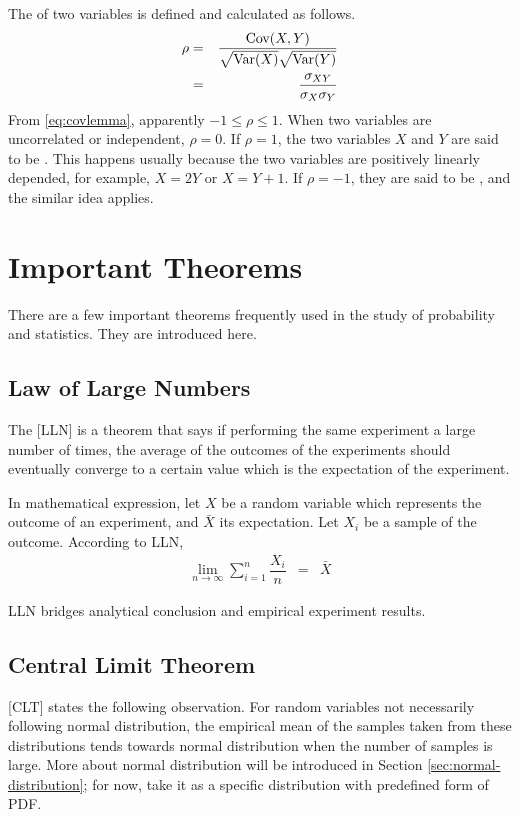 The  of two variables is defined and calculated as follows.
\begin{eqnarray}
	\rho &=& \dfrac{\textup{Cov}(X, Y)}{\sqrt{\textup{Var}(X)}\sqrt{\textup{Var}(Y)}} \nonumber \\
	&=& \dfrac{\sigma_{XY}}{\sigma_X\sigma_Y} \nonumber
\end{eqnarray}
From \eqref{eq:covlemma}, apparently $-1\leq \rho \leq 1$. When two variables are uncorrelated or independent, $\rho=0$. If $\rho=1$, the two variables $X$ and $Y$ are said to be . This happens usually because the two variables are positively linearly depended, for example, $X=2Y$ or $X=Y+1$. If $\rho=-1$, they are said to be , and the similar idea applies.

\section{Important Theorems}

There are a few important theorems frequently used in the study of probability and statistics. They are introduced here.

\subsection{Law of Large Numbers} \label{subsec:largenumbers}

The [LLN] is a theorem that says if performing the same experiment a large number of times, the average of the outcomes of the experiments should eventually converge to a certain value which is the expectation of the experiment.

In mathematical expression, let $X$ be a random variable which represents the outcome of an experiment, and $\bar{X}$ its expectation. Let $X_i$ be a sample of the outcome. According to LLN,
\begin{eqnarray}
	\lim_{n\rightarrow\infty} \sum_{i=1}^{n}\dfrac{X_i}{n} &=& \bar{X} \nonumber
\end{eqnarray}

LLN bridges analytical conclusion and empirical experiment results.

\subsection{Central Limit Theorem}

[CLT] states the following observation. For  random variables not necessarily following normal distribution, the empirical mean of the samples taken from these distributions tends towards normal distribution when the number of samples is large. More about normal distribution will be introduced in Section \ref{sec:normal-distribution}; for now, take it as a specific distribution with predefined form of PDF.

